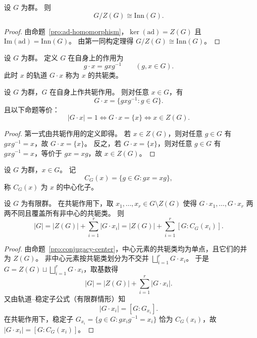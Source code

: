\documentclass[lang=cn,a4paper,newtx]{elegantbook}
\begin{document}
\begin{corollary}
  设 $G$ 为群。
  则
  \[
    G/Z(G)\cong \mathrm{Inn}(G).
  \]
\end{corollary}

\begin{proof}
  由命题~\ref{pro:ad-homomorphism}，$\ker(\mathrm{ad})=Z(G)$ 且 $\mathrm{Im}(\mathrm{ad})=\mathrm{Inn}(G)$。
  由第一同构定理得 $G/Z(G)\cong \mathrm{Inn}(G)$。
\end{proof}

\begin{remark}[共轭作用]
  设 $G$ 为群。
  定义 $G$ 在自身上的作用为
  \[
    g\cdot x=gxg^{-1}\qquad (g,x\in G).
  \]
  此时 $x$ 的轨道 $G\cdot x$ 称为 $x$ 的共轭类。
\end{remark}

\begin{proposition}\label{conjugacy-center}
  设 $G$ 为群，$G$ 在自身上作共轭作用。
  则对任意 $x\in G$，有
  \[
    G\cdot x=\{gxg^{-1}:g\in G\}.
  \]
  且以下命题等价：
  \[
    |G\cdot x|=1\iff G\cdot x=\{x\}\iff x\in Z(G).
  \]
\end{proposition}

\begin{proof}
  第一式由共轭作用的定义即得。
  若 $x\in Z(G)$，则对任意 $g\in G$ 有 $gxg^{-1}=x$，故 $G\cdot x=\{x\}$。
  反之，若 $G\cdot x=\{x\}$，则对任意 $g\in G$ 有 $gxg^{-1}=x$，等价于 $gx=xg$，故 $x\in Z(G)$。
\end{proof}

\begin{definition}[中心化子]
  设 $G$ 为群，$x\in G$。
  记
  \[
    C_G(x)=\{g\in G:gx=xg\},
  \]
  称 $C_G(x)$ 为 $x$ 的中心化子。
\end{definition}

\begin{proposition}[类方程]
  设 $G$ 为有限群。
  在共轭作用下，取 $x_1,\dots,x_r\in G\setminus Z(G)$ 使得 $G\cdot x_1,\dots,G\cdot x_r$ 两两不同且覆盖所有非中心的共轭类。
  则
  \[
    |G|=|Z(G)|+\sum_{i=1}^r |G\cdot x_i|=|Z(G)|+\sum_{i=1}^r [G:C_G(x_i)].
  \]
\end{proposition}

\begin{proof}
  由命题~\ref{pro:conjugacy-center}，中心元素的共轭类均为单点，且它们的并为 $Z(G)$。
  非中心元素按共轭类划分为不交并 $\bigsqcup_{i=1}^r G\cdot x_i$。
  于是 $G=Z(G)\sqcup\bigsqcup_{i=1}^r G\cdot x_i$，取基数得
  \[
    |G|=|Z(G)|+\sum_{i=1}^r |G\cdot x_i|.
  \]
  又由轨道--稳定子公式（有限群情形）知
  \[
    |G\cdot x_i|=[G:G_{x_i}].
  \]
  在共轭作用下，稳定子 $G_{x_i}=\{g\in G:gx_ig^{-1}=x_i\}$ 恰为 $C_G(x_i)$，故 $|G\cdot x_i|=[G:C_G(x_i)]$。
\end{proof}
\end{document}
